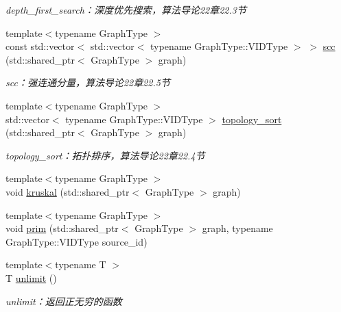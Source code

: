 \begin{DoxyCompactItemize}
\begin{DoxyCompactList}\small\item\em depth\+\_\+first\+\_\+search：深度优先搜索，算法导论22章22.3节 \end{DoxyCompactList}\item 
{\footnotesize template$<$typename Graph\+Type $>$ }\\const std\+::vector$<$ std\+::vector$<$ typename Graph\+Type\+::\+V\+I\+D\+Type $>$ $>$ \hyperlink{namespace_introduction_to_algorithm_1_1_graph_algorithm_a6d058c2aaa8714778b3f2ab8a24ff232}{scc} (std\+::shared\+\_\+ptr$<$ Graph\+Type $>$ graph)
\begin{DoxyCompactList}\small\item\em scc：强连通分量，算法导论22章22.5节 \end{DoxyCompactList}\item 
{\footnotesize template$<$typename Graph\+Type $>$ }\\std\+::vector$<$ typename Graph\+Type\+::\+V\+I\+D\+Type $>$ \hyperlink{namespace_introduction_to_algorithm_1_1_graph_algorithm_a804241e72be5f4c031190bc12a6b73a2}{topology\+\_\+sort} (std\+::shared\+\_\+ptr$<$ Graph\+Type $>$ graph)
\begin{DoxyCompactList}\small\item\em topology\+\_\+sort：拓扑排序，算法导论22章22.4节 \end{DoxyCompactList}\item 
{\footnotesize template$<$typename Graph\+Type $>$ }\\void \hyperlink{namespace_introduction_to_algorithm_1_1_graph_algorithm_a6586a1f6485cc30b643ef752eee9b783}{kruskal} (std\+::shared\+\_\+ptr$<$ Graph\+Type $>$ graph)
\item 
{\footnotesize template$<$typename Graph\+Type $>$ }\\void \hyperlink{namespace_introduction_to_algorithm_1_1_graph_algorithm_ac79afa99e5119649d01d613fb01f3984}{prim} (std\+::shared\+\_\+ptr$<$ Graph\+Type $>$ graph, typename Graph\+Type\+::\+V\+I\+D\+Type source\+\_\+id)
\item 
{\footnotesize template$<$typename T $>$ }\\T \hyperlink{namespace_introduction_to_algorithm_1_1_graph_algorithm_a19237111c3b1ec2717c5e1aefe2f6d9b}{unlimit} ()
\begin{DoxyCompactList}\small\item\em unlimit：返回正无穷的函数 \end{DoxyCompactList}\item 

\end{DoxyCompactItemize}
